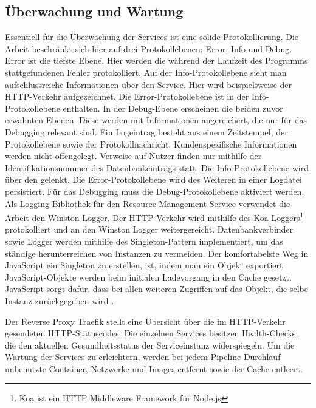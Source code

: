 \subsection{Überwachung und Wartung}
\label{subsec:ueberwachungundwartung}
Essentiell für die Überwachung der Services ist eine solide Protokollierung.
Die Arbeit beschränkt sich hier auf drei Protokollebenen; Error, Info und Debug.
Error ist die tiefste Ebene. Hier werden die während der Laufzeit des Programms
stattgefundenen Fehler protokolliert. Auf der Info-Protokollebene sieht man
aufschlussreiche Informationen über den Service. Hier wird beispielsweise
der HTTP-Verkehr aufgezeichnet. Die Error-Protokollebene ist in der Info-Protokollebene
enthalten. In der Debug-Ebene erscheinen die beiden zuvor erwähnten Ebenen. Diese
werden mit Informationen angereichert, die nur für das Debugging relevant sind.
Ein Logeintrag besteht aus einem Zeitstempel, der Protokollebene sowie der Protokollnachricht.
Kundenspezifische Informationen werden nicht offengelegt. Verweise auf Nutzer finden nur
mithilfe der Identifikationsnummer des Datenbankeintrags statt. Die Info-Protokollebene
wird über den  gelenkt. Die Error-Protokollebene wird des Weiteren in einer
Logdatei persistiert. Für das Debugging muss die Debug-Protokollebene aktiviert werden.
Als Logging-Bibliothek für den Resource Management Service verwendet die Arbeit den Winston
Logger. Der HTTP-Verkehr wird mithilfe des Koa-Loggers\footnote{Koa ist ein HTTP Middleware Framework für Node.js} protokolliert und an den Winston
Logger weitergereicht. Datenbankverbinder sowie Logger werden mithilfe des Singleton-Pattern
implementiert, um das ständige herunterreichen von Instanzen zu vermeiden. Der komfortabelste
Weg in JavaScript ein Singleton zu erstellen, ist, indem man ein Objekt exportiert. JavaScript-Objekte
werden beim initialen Ladevorgang in den Cache gesetzt. JavaScript sorgt dafür,
dass bei allen weiteren Zugriffen auf das Objekt, die selbe Instanz zurückgegeben wird \cite{NodeJsCaching}.

Der Reverse Proxy Traefik stellt eine Übersicht über die im HTTP-Verkehr gesendeten 
HTTP-Statuscodes. Die einzelnen Services besitzen Health-Checks, die den aktuellen
Gesundheitsstatus der Serviceinstanz widerspiegeln. Um die Wartung der Services zu erleichtern,
werden bei jedem Pipeline-Durchlauf unbenutzte Container, Netzwerke und Images
entfernt sowie der Cache entleert.

